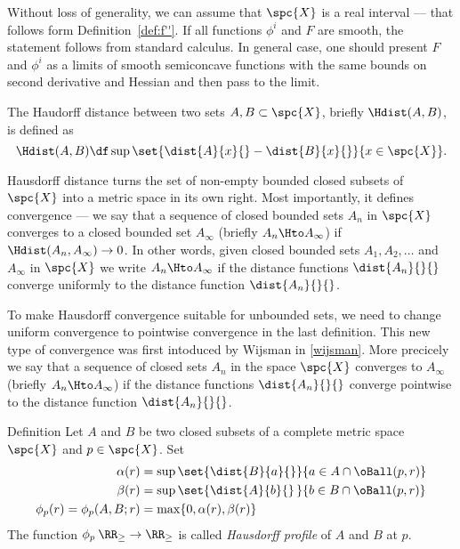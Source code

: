 Without loss of generality, we can assume that $\spc{X}$ is a real interval 
--- that follows form Definition~\ref{def:f''}.
If all functions $\phi^i$ and $F$ are smooth,
the statement follows from standard calculus.
In general case, one should present $F$ and $\phi^i$ as a limits of smooth semiconcave functions with the same bounds on second derivative and Hessian and then pass to the limit.
\qeds

















The Haudorff distance between two sets $A, B\subset \spc{X}$, briefly $\Hdist(A,B)$,
is defined as 
$$\Hdist(A,B)\df\sup\set{\dist{A}{x}{}-\dist{B}{x}{}}{x\in \spc{X}}.$$

Hausdorff distance turns the set of non-empty bounded closed subsets of $\spc{X}$ into a metric space in its own right.
Most importantly,
it defines convergence --- we say that a sequence of closed bounded sets $A_n$ in $\spc{X}$ converges to a closed bounded set $A_\infty$ (briefly $A_n\Hto A_\infty$) if $\Hdist(A_n,A_\infty)\to 0$.
In other words, given closed bounded sets $A_1,A_2,\dots$ and $A_\infty$ in $\spc{X}$
we write $A_n\Hto A_\infty$ if the distance functions 
$\dist{A_n}{}{}$ converge uniformly to the distance function $\dist{A_n}{}{}$.

To make Hausdorff convergence suitable for unbounded sets, we need to change uniform convergence to pointwise convergence in the last definition.
This new type of convergence was first intoduced by Wijsman in \ref{wijsman}.
More precicely we say that a sequence of closed sets $A_n$ in the space $\spc{X}$ converges 
to $A_\infty$ (briefly $A_n\Hto A_\infty$) if the distance functions 
$\dist{A_n}{}{}$ converge pointwise to the distance function $\dist{A_n}{}{}$.



\begin{thm}{Definition}
Let $A$ and $B$ be two closed subsets of a complete metric space $\spc{X}$ and $p\in\spc{X}$.
Set 
\begin{align*}
\alpha(r)&=\sup\set{\dist{B}{a}{}}{a\in A\cap\oBall(p,r)}\\
\beta(r)&=\sup\set{\dist{A}{b}{}\,}{b\in B\cap\oBall(p,r)}\\
\phi_p(r)=\phi_p(A,B;r)&=\max\{0,\alpha(r),\beta(r)\}
\end{align*}
The function $\phi_p\:\RR_\ge\to\RR_\ge$ is called \emph{Hausdorff profile} of $A$ and $B$ at $p$.
\end{thm}

